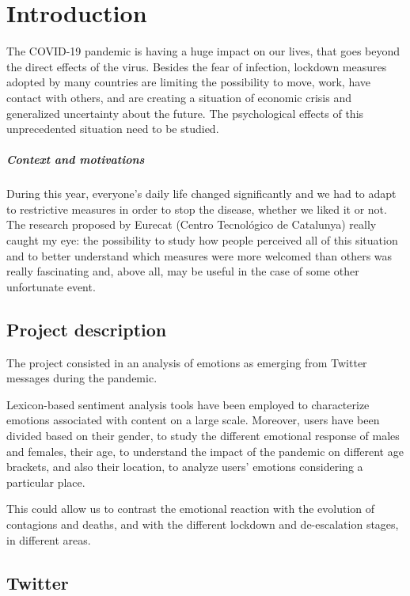 \chapter{Introduction}
\label{cha:intro}

The COVID-19 pandemic is having a huge impact on our lives, that goes beyond the direct effects of the virus. Besides the fear of infection, lockdown measures adopted by many countries are limiting the possibility to move, work, have contact with others, and are creating a situation of economic crisis and generalized uncertainty about the future. The psychological effects of this unprecedented situation need to be studied.

\paragraph{Context and motivations}

During this year, everyone's daily life changed significantly and we had to adapt to restrictive measures in order to stop the disease, whether we liked it or not. The research proposed by Eurecat (Centro Tecnológico de Catalunya) really caught my eye: the possibility to study how people perceived all of this situation and to better understand which measures were more welcomed than others was really fascinating and, above all, may be useful in the case of some other unfortunate event.

\section{Project description}
\label{sec:project}

The project consisted in an analysis of emotions as emerging from Twitter messages during the pandemic.

Lexicon-based sentiment analysis tools have been employed to characterize emotions associated with content on a large scale. Moreover, users have been divided based on their gender, to study the different emotional response of males and females, their age, to understand the impact of the pandemic on different age brackets, and also their location, to analyze users' emotions considering a particular place.

This could allow us to contrast the emotional reaction with the evolution of contagions and deaths, and with the different lockdown and de-escalation stages, in different areas.

\section{Twitter}
\label{sec:twitter}

